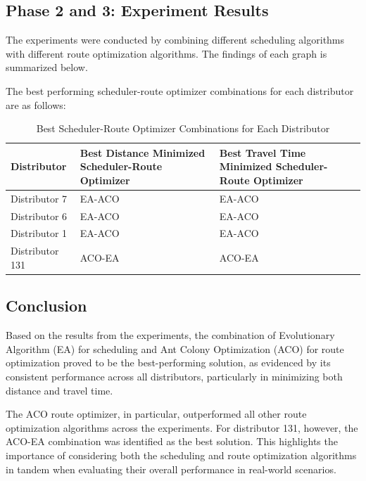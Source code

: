 \subsection{Phase 2 and 3: Experiment Results}
The experiments were conducted by combining different scheduling algorithms with different route optimization algorithms. The findings of each graph is summarized below.



The best performing scheduler-route optimizer combinations for each distributor are as follows:

\begin{table}[h!]
\centering
\begin{tabular}{|l|l|l|}
    \hline
    \textbf{Distributor} & \textbf{Best Distance Minimized Scheduler-Route Optimizer} & \textbf{Best Travel Time Minimized Scheduler-Route Optimizer} \\
    \hline
    Distributor 7 & EA-ACO & EA-ACO \\
    Distributor 6 & EA-ACO & EA-ACO \\
    Distributor 1 & EA-ACO & EA-ACO \\
    Distributor 131 & ACO-EA & ACO-EA \\
    \hline
    
\end{tabular}
\caption{Best Scheduler-Route Optimizer Combinations for Each Distributor}
\end{table}

\subsection{Conclusion}
Based on the results from the experiments, the combination of Evolutionary Algorithm (EA) for scheduling and Ant Colony Optimization (ACO) for route optimization proved to be the best-performing solution, as evidenced by its consistent performance across all distributors, particularly in minimizing both distance and travel time.

The ACO route optimizer, in particular, outperformed all other route optimization algorithms across the experiments. For distributor 131, however, the ACO-EA combination was identified as the best solution. This highlights the importance of considering both the scheduling and route optimization algorithms in tandem when evaluating their overall performance in real-world scenarios.


